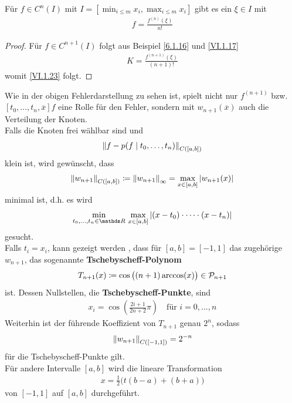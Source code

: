 \begin{Fole}
  Für $f\in C^n(I) $ mit $I=[\min_{i\leq m}x_i, \max_{i\leq m}x_i]$
  gibt es ein $\xi\in I$ mit 
  \begin{gather}
    [t_0,\dots,t_n]f=\frac{f^{(n)}(\xi)}{n!}
    \label{VI.1.23}
  \end{gather}

  \begin{proof}
    Für $f\in C^{n+1}(I)$ folgt aus
    Beispiel \ref{6.1.16} und \eqref{VI.1.17}
    \begin{gather*}
      K= \frac{f^{(n+1)}(\xi)}{(n+1)!}
    \end{gather*}
    womit \eqref{VI.1.23} folgt.
  \end{proof}
\end{Fole}

Wie in der obigen Fehlerdarstellung zu sehen ist,
spielt nicht nur $f^{(n+1)}$ bzw.
$[t_0,\dots,t_n, \overline{x}]f$ eine Rolle für den Fehler,
sondern mit $w_{n+1}(\overline{x})$ auch die Verteilung der Knoten.\\
Falls die Knoten frei wählbar sind und
\begin{gather*}
  \left\| f-p(f\mid t_0,\dots,t_n) \right\|_{C([a,b])}
\end{gather*}
klein ist, wird gewünscht, dass
\begin{gather*}\index{Norm}
  \nn{w_{n+1}}_{C([a,b])}\coloneqq \nn{w_{n+1}}_\infty
  = \max_{x\in[a,b]}|w_{n+1}(x)|
\end{gather*}
minimal ist, d.h.
es wird 
\begin{gather*}
  \min_{t_0,\dots,t_n\in\R}\,\max_{x\in[a,b]}
  |(x-t_0)\cdot\dots\cdot(x-t_n)|
\end{gather*}
gesucht.\\
Falls $t_i=x_i$, kann gezeigt werden 
\cite[z.B.][]{deuflhardhohmann,freundhoppe},
dass für $[a,b]=[-1,1]$ das zugehörige $w_{n+1}$,
das sogenannte
\textbf{Tschebyscheff-Polynom}
\begin{gather}
  T_{n+1}(x)\coloneqq \cos\big((n+1)\arccos(x)\big)\in\mathcal{P}_{n+1}
  \label{VI.1.24}
\end{gather}
ist. Dessen Nullstellen, die 
\textbf{Tschebyscheff-Punkte},
sind
\begin{gather}
  x_i= \cos\left(\frac{2i+1}{2n+2}\pi\right)\quad \text{für } i=0,\dots,n
  \label{VI.1.25}
\end{gather}
Weiterhin ist der führende Koeffizient von $T_{n+1}$ genau $2^n$,
sodass 
\begin{gather}
  \left\| w_{n+1} \right\|_{C([-1,1])}=2^{-n}
  \label{VI.1.26}
\end{gather}
für die Tschebyscheff-Punkte gilt.\\
Für andere Intervalle $[a,b]$ wird die lineare Transformation
\begin{gather*}
  x=\frac{1}{2}\big(t(b-a)+(b+a)\big)
\end{gather*}
von $[-1,1]$ auf $[a,b]$ durchgeführt.

